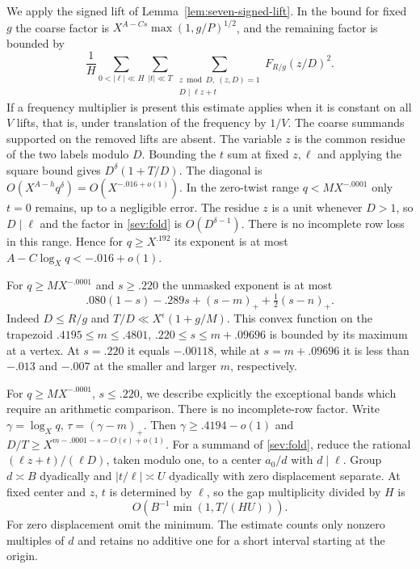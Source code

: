 \documentclass[11pt,a4paper]{article}
\theoremstyle{paperplain}
\numberwithin{equation}{section}
\begin{document}
We apply the signed lift of Lemma~\ref{lem:seven-signed-lift}. In the bound for fixed $g$
the coarse factor is
$X^{A-Cs}\max(1,g/P)^{1/2}$, and the remaining factor is bounded by
\begin{equation}
 \frac1H\sum_{0<|\ell|\ll H}\sum_{|t|\ll T}
 \sum_{\substack{z\bmod D,\ (z,D)=1\\D\mid\ell z+t}}
 F_{R/g}(z/D)^2 .
 \label{sev:fold}
\end{equation}
If a frequency multiplier is present this estimate applies when it is
constant on all $V$ lifts, that is, under translation of the frequency
by $1/V$. The coarse summands supported on the removed lifts are absent.
The variable $z$ is the common residue of the two labels modulo $D$.
Bounding the $t$ sum at fixed $z,\ell$ and applying the square bound gives
$D^\delta(1+T/D)$. The diagonal is
$O(X^{A-h}q^\delta)=O(X^{-.016+o(1)})$.
In the zero-twist range $q<MX^{-.0001}$ only $t=0$ remains,
up to a negligible error. The residue $z$ is a unit whenever
$D>1$, so $D\mid\ell$ and the factor in \eqref{sev:fold} is
$O(D^{\delta-1})$. There is no incomplete row loss in this range.
Hence for $q\ge X^{.192}$ its exponent is at most
$A-C\log_X q<-.016+o(1)$.

For $q\ge MX^{-.0001}$ and $s\ge .220$ the unmasked exponent is
at most
\[
 .080(1-s)-.289s+(s-m)_++\tfrac12(s-n)_+.
\]
Indeed $D\le R/g$ and $T/D\ll X^{\epsilon}(1+g/M)$.
This convex function on the trapezoid
$.4195\le m\le .4801$, $.220\le s\le m+.09696$
is bounded by its maximum at a vertex. At $s=.220$ it equals
$-.00118$, while at $s=m+.09696$ it is less than $-.013$
and $-.007$ at the smaller and larger $m$, respectively.

For $q\ge MX^{-.0001}$, $s\le .220$, we describe explicitly the
exceptional bands which require an arithmetic comparison.
There is no incomplete-row factor. Write $\gamma=\log_X q$,
$\tau=(\gamma-m)_+$. Then $\gamma\ge .4194-o(1)$ and
$D/T\ge X^{m-.0001-s-O(\epsilon)+o(1)}$.
For a summand of \eqref{sev:fold}, reduce the rational
$(\ell z+t)/(\ell D)$, taken modulo one, to a center $a_0/d$
with $d\mid\ell$. Group $d\asymp B$ dyadically and
$|t/\ell|\asymp U$ dyadically with zero displacement separate.
At fixed center and $z$, $t$ is determined by $\ell$, so the
gap multiplicity divided by $H$ is
\[
 O(B^{-1}\min(1,T/(HU))).
\]
For zero displacement omit the minimum. The estimate counts only
nonzero multiples of $d$ and retains no additive one for a short
interval starting at the origin.
\end{document}
